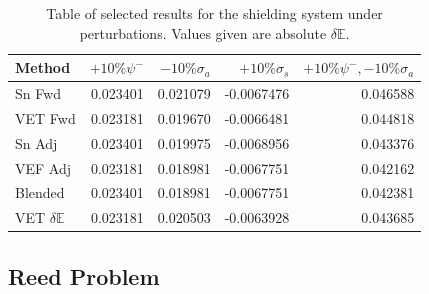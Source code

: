 \documentclass[12pt]{report}
\newcommand{\Edd}{\mathbb{E}}
\newcommand{\sigs}{\sigma_s}
\newcommand{\siga}{\sigma_a}
\begin{document}
\begin{table}[H]
\centering
  \begin{tabular}{| l | r | r | r | r |}
    \hline
    Method  &  $+10\% \psi^- $  & $-10\% \siga $ & $+10\% \sigs $ & $+10\% \psi^-,-10\% \siga$ \\ \hline
     Sn Fwd 			&0.023401 &0.021079 &-0.0067476 & 0.046588\\ \hline
     VET Fwd			&0.023181 &0.019670 &-0.0066481 &0.044818\\ \hline
     Sn Adj  			&0.023401 &0.019975 &-0.0068956 &0.043376\\ \hline
     VEF Adj 			&0.023181 &0.018981 &-0.0067751 &0.042162\\ \hline
     Blended 			&0.023401 &0.018981 &-0.0067751 &0.042381\\ \hline
     VET $\delta \Edd$ 	&0.023181 &0.020503 &-0.0063928 &0.043685\\ \hline
    \end{tabular}
  \caption{Table of selected results for the shielding system under perturbations. Values given are absolute $\delta \Edd$. }
\end{table}

\subsection{Reed Problem}
\end{document}
